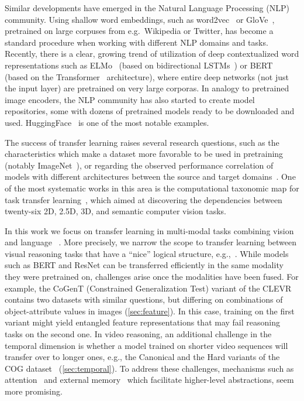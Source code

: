 Similar developments have emerged in the Natural Language Processing (NLP) community.
Using shallow word embeddings, such as word2vec~\cite{mikolov2013distributed} or GloVe~\cite{pennington2014glove}, pretrained on large corpuses from e.g.\ Wikipedia or Twitter, has become a standard procedure when working with different NLP domains and tasks.
Recently, there is a clear, growing trend of utilization of deep contextualized word representations such as ELMo~\cite{peters2018deep} (based on bidirectional LSTMs~\cite{hochreiter1997long}) or BERT~\cite{devlin2018bert} (based on the Transformer~\cite{vaswani2017attention} architecture), where entire deep networks (not just the input layer) are pretrained on very large corporas.
In analogy to pretrained image encoders, the NLP community has also started to create model repositories, some with dozens of pretrained models ready to be downloaded and used. HuggingFace~\cite{wolf2019transformers} is one of the most notable examples.

The success of transfer learning raises several research questions, such as the characteristics which make a dataset more favorable to be used in pretraining (notably ImageNet~\cite{huh2016makes}), or regarding the observed performance correlation of models with different architectures between the source and target domains~\cite{kornblith2019better}.
One of the most systematic works in this area is the computational taxonomic map for task transfer learning~\cite{zamir2018taskonomy}, which aimed at discovering the dependencies between twenty-six 2D, 2.5D, 3D, and semantic computer vision tasks.

In this work we focus on transfer learning in multi-modal tasks combining vision and language~\cite{mogadala2019trends} .
More precisely, we narrow the scope to transfer learning between visual reasoning tasks that have a ``nice'' logical structure, e.g.,~\cite{johnson2017clevr,yang2018dataset,song2018explore}. 
While models such as BERT and ResNet can be transferred efficiently in the same modality they were pretrained on, challenges arise
once the modalities have been fused.
For example, the CoGenT (Constrained Generalization Test) variant of the CLEVR~\cite{johnson2017clevr}  
contains two datasets with similar questions, but differing on combinations of object-attribute values in images 
(\cref{sec:feature}).
In this case, training on the first variant might yield entangled feature representations that may fail reasoning tasks
on the second one.
In video reasoning, an additional challenge in the temporal dimension is whether a model trained on shorter video sequences will 
transfer over to longer ones, e.g., the Canonical and the Hard variants of the 
COG dataset~\cite{yang2018dataset} (\cref{sec:temporal}).
To address these challenges, mechanisms such as attention~\cite{bahdanau2014neural} 
and external memory~\cite{graves2014neural, graves2016hybrid,weston2014memory} 
which facilitate higher-level abstractions, seem more promising. 

